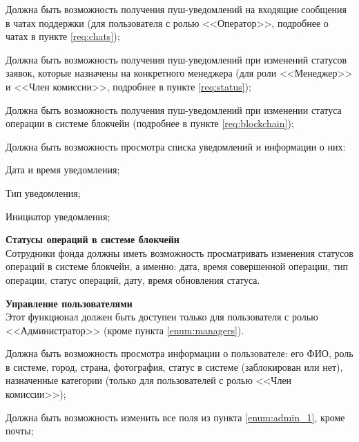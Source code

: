 \begin{subreg}
    \begin{subreg}
        \item Должна быть возможность получения пуш-уведомлений на входящие сообщения в чатах поддержки (для пользователя с ролью <<Оператор>>, подробнее о чатах в пункте \ref{req:chats});
        
        \item Должна быть возможность получения пуш-уведомлений при изменений статусов заявок, которые назначены на конкретного менеджера (для роли <<Менеджер>> и <<Член комиссии>>, подробнее в пункте \ref{req:status});
        
        \item Должна быть возможность получения пуш-уведомлений при изменении статуса операции в системе блокчейн (подробнее в пункте \ref{req:blockchain});
        
        \item Должна быть возможность просмотра списка уведомлений и информации о них:
        \begin{subreg}
        \item Дата и время уведомления;
        \item Тип уведомления;
        \item Инициатор уведомления;
        \end{subreg}
    \end{subreg}
    
    \item \textbf{Статусы операций в системе блокчейн\\} \label{req:blockchain}
    Сотрудники фонда должны иметь возможность просматривать изменения статусов операций в системе блокчейн, а именно: дата, время совершенной операции, тип операции, статус операций, дату, время обновления статуса.
    
    \item \textbf{Управление пользователями\\}
        Этот функционал должен быть доступен только для пользователя с ролью <<Администратор>> (кроме пункта \ref{enum:managers}).
        \begin{subreg}
        \label{admin}
        \item \label{enum:admin_1} Должна быть возможность просмотра информации о пользователе: его ФИО, роль в системе, город, страна, фотография, статус в системе (заблокирован или нет), назначенные категории (только для пользователей с ролью <<Член комиссии>>);
        \item Должна быть возможность изменить все поля из пункта \ref{enum:admin_1}, кроме почты;
        

\end{subreg}
\end{subreg}
